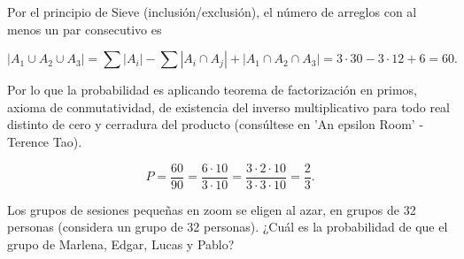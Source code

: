 Por el principio de Sieve (inclusión/exclusión), el número de arreglos con al menos un par consecutivo es

\[
|A_1 \cup A_2 \cup A_3| = \sum |A_i| - \sum |A_i \cap A_j| + |A_1 \cap A_2 \cap A_3| = 3 \cdot 30 - 3 \cdot 12 + 6 = 60.
\]

Por lo que la probabilidad es aplicando teorema de factorización en primos, axioma de conmutatividad, de existencia del inverso multiplicativo para todo real distinto de cero y cerradura del producto (consúltese en 'An epsilon Room' - Terence Tao).

\[
P = \frac{60}{90} = \frac{6 \cdot 10}{3 \cdot 10} = \frac{3 \cdot 2 \cdot 10}{3 \cdot 3\cdot 10} = \frac{2}{3}.
\]


Los grupos de sesiones pequeñas en zoom se eligen al azar, en grupos de 32 personas (considera un grupo de 32 personas). ¿Cuál es la probabilidad de que el grupo de Marlena, Edgar, Lucas y Pablo?

